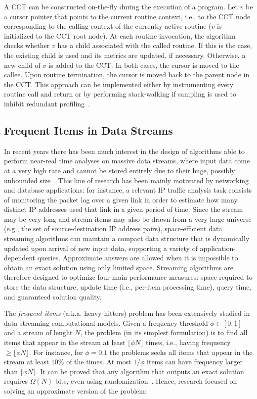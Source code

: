 \documentclass{sigplanconf}
\begin{document}
A CCT can be constructed on-the-fly during the execution of a program. Let $v$ be a cursor pointer that points to
the current routine context, i.e., to the  CCT node corresponding to the calling context of the currently active routine ($v$ is initialized to the CCT root node). At each routine invocation, the algorithm checks whether $v$ has a child associated with the called routine. If this is the case, the existing child is used and its metrics are updated, if necessary. Otherwise, a new child of $v$ is added to the CCT.  In both cases, the cursor is moved to the callee. Upon routine termination, the cursor is moved back to the parent node in the CCT. 
This approach can be implemented either by instrumenting every routine call and return or by performing stack-walking if sampling is used to inhibit redundant profiling~\cite{AS00, W00, ZSCC06}.

\subsection{Frequent Items in Data Streams}
\label{ss:frequent}

In recent years there has been much interest in the design of algorithms able to perform near-real time analyses on massive data streams, where input data come at a very high rate and cannot be stored entirely due to their huge, possibly unbounded size~\cite{DF07, M05}. This line of research has been mainly motivated by networking and database applications: for instance, a relevant IP traffic analysis task consists of monitoring the packet log over a given link in order to estimate how many distinct IP addresses used that link in a given period of time. Since the stream may be very long and stream items may also be drawn from a very large universe (e.g., the set of source-destination IP address pairs), space-efficient data streaming algorithms can maintain a compact data structure that is dynamically updated upon arrival of new input data, supporting a variety of application-dependent queries. Approximate answers are allowed when it is impossible to obtain an exact solution using only limited space. Streaming algorithms are therefore designed to optimize four main performance measures: space required to store the data structure, update time (i.e., per-item processing time), query time, and guaranteed solution quality.

The {\em frequent items} (a.k.a. heavy hitters) problem has been extensively studied in data streaming computational models. Given a frequency threshold $\phi\in[0,1]$ and a stream of lenght $N$, the problem (in its simplest formulation) is to find all items that appear in the stream at least $\lfloor\phi N\rfloor$ times, i.e., having frequency $\ge\lfloor\phi N\rfloor$. For instance, for $\phi=0.1$ the problems seeks all items that appear in the stream at least $10\%$ of the times. At most $1/\phi$ items can have frequency larger than $\lfloor\phi N\rfloor$.  It can be proved that any algorithm that outputs an exact solution requires $\Omega(N)$ bits, even using randomization~\cite{M05}. Hence, research focused on solving an approximate version of the problem:
\end{document}
